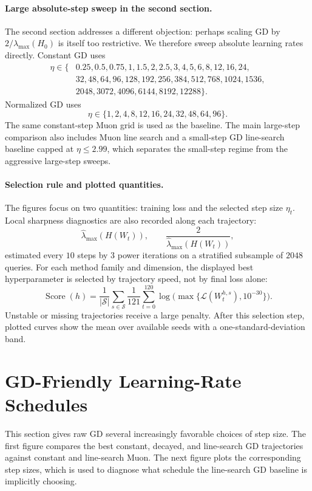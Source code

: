 \documentclass[11pt]{article}
\newcommand{\loss}{\mathcal{L}}
\begin{document}
\paragraph{Large absolute-step sweep in the second section.}
The second section addresses a different objection: perhaps scaling GD by
$2/\lambda_{\max}(H_0)$ is itself too restrictive.  We therefore sweep
absolute learning rates directly.  Constant GD uses
\[
\begin{aligned}
    \eta\in\{&
    0.25,0.5,0.75,1,1.5,2,2.5,3,4,5,6,8,12,16,24,\\
    &32,48,64,96,128,192,256,384,512,768,1024,1536,\\
    &2048,3072,4096,6144,8192,12288\}.
\end{aligned}
\]
Normalized GD uses
\[
    \eta\in\{1,2,4,8,12,16,24,32,48,64,96\}.
\]
The same constant-step Muon grid is used as the baseline.  The main
large-step comparison also includes Muon line search and a small-step GD
line-search baseline capped at $\eta\le2.99$, which separates the small-step
regime from the aggressive large-step sweeps.

\paragraph{Selection rule and plotted quantities.}
The figures focus on two quantities: training loss and the selected step size
$\eta_t$.  Local sharpness diagnostics are also recorded along each
trajectory:
\[
    \widehat\lambda_{\max}(H(W_t)),
    \qquad
    \frac{2}{\widehat\lambda_{\max}(H(W_t))},
\]
estimated every $10$ steps by $3$ power iterations on a stratified subsample
of $2048$ queries.  For each method family and dimension, the displayed best
hyperparameter is selected by trajectory speed, not by final loss alone:
\[
    \operatorname{Score}(h)
    =
    \frac{1}{|\mathcal{S}|}
    \sum_{s\in\mathcal{S}}
    \frac{1}{121}
    \sum_{t=0}^{120}
    \log\bigl(\max\{\loss(W_t^{h,s}),10^{-30}\}\bigr).
\]
Unstable or missing trajectories receive a large penalty.  After this
selection step, plotted curves show the mean over available seeds with a
one-standard-deviation band.

\section{GD-Friendly Learning-Rate Schedules}

This section gives raw GD several increasingly favorable choices of step
size.  The first figure compares the best constant, decayed, and line-search
GD trajectories against constant and line-search Muon.  The next figure plots
the corresponding step sizes, which is used to diagnose what schedule the
line-search GD baseline is implicitly choosing.
\end{document}
